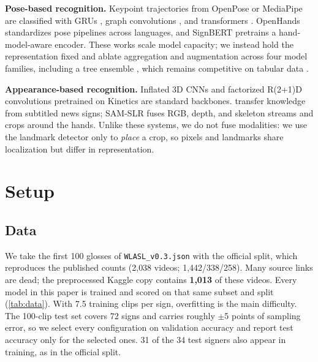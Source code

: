 \documentclass{article}
\begin{document}
\textbf{Pose-based recognition.} Keypoint trajectories from OpenPose or MediaPipe
\citep{zhang2020mediapipehands} are classified with GRUs \citep{li2020wlasl}, graph convolutions
\citep{li2020wlasl,tunga2021gcnbert}, and transformers \citep{bohacek2022spoter}. OpenHands
\citep{selvaraj2022openhands} standardizes pose pipelines across languages, and SignBERT
\citep{hu2021signbert} pretrains a hand-model-aware encoder. These works scale model capacity; we instead
hold the representation fixed and ablate aggregation and augmentation across four model families,
including a tree ensemble \citep{chen2016xgboost}, which remains competitive on tabular data
\citep{grinsztajn2022tree}.

\textbf{Appearance-based recognition.} Inflated 3D CNNs \citep{carreira2017quo} and factorized
R(2+1)D convolutions \citep{tran2018closer} pretrained on Kinetics \citep{kay2017kinetics} are standard
backbones. \citet{li2020transferring} transfer knowledge from subtitled news signs; SAM-SLR
\citep{jiang2021skeleton} fuses RGB, depth, and skeleton streams and crops around the hands. Unlike these
systems, we do not fuse modalities: we use the landmark detector only to \emph{place} a crop, so pixels and
landmarks share localization but differ in representation.

\section{Setup}\label{sec:setup}
\subsection{Data}
We take the first 100 glosses of \texttt{WLASL\_v0.3.json} with the official split, which reproduces the
published counts (2{,}038 videos; 1{,}442/338/258). Many source links are dead; the preprocessed Kaggle
copy contains \textbf{1{,}013} of these videos. Every model in this paper is trained and scored on that
same subset and split (\cref{tab:data}). With 7.5 training clips per sign, overfitting is the main
difficulty. The 100-clip test set covers 72 signs and carries roughly $\pm$5 points of sampling error,
so we select every configuration on validation accuracy and report test accuracy only for the selected
ones. 31 of the 34 test signers also appear in training, as in the official split.
\end{document}
